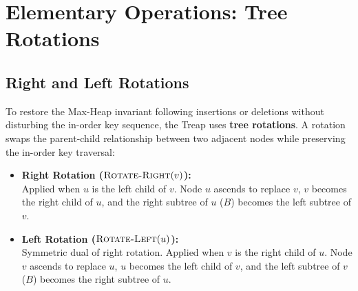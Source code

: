 \FloatBarrier
\section{Elementary Operations: Tree Rotations}
\label{sec:tree-rotations-en}

\subsection{Right and Left Rotations}
To restore the Max-Heap invariant following insertions or deletions without disturbing the in-order key sequence, the Treap uses \textbf{tree rotations}. A rotation swaps the parent-child relationship between two adjacent nodes while preserving the in-order key traversal:

\begin{itemize}
    \item \textbf{Right Rotation ($\textsc{Rotate-Right}(v)$):}\\
    Applied when $u$ is the left child of $v$. Node $u$ ascends to replace $v$, $v$ becomes the right child of $u$, and the right subtree of $u$ ($B$) becomes the left subtree of $v$.
    
    \item \textbf{Left Rotation ($\textsc{Rotate-Left}(u)$):}\\
    Symmetric dual of right rotation. Applied when $v$ is the right child of $u$. Node $v$ ascends to replace $u$, $u$ becomes the left child of $v$, and the left subtree of $v$ ($B$) becomes the right subtree of $u$.
\end{itemize}

